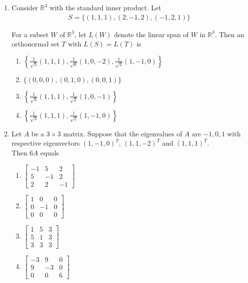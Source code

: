 \documentclass[journal]{IEEEtran}
\newcommand{\myvec}[1]{\begin{bmatrix}#1\end{bmatrix}}
\numberwithin{equation}{enumi}
\numberwithin{figure}{enumi}
\begin{document}
\begin{enumerate}
\item Consider $\mathbb{R}^3$ with the standard inner product. Let
\begin{align*}
 S = \{(1,1,1), (2,-1,2), (-1,2,1)\}   
\end{align*}

For a subset $W$ of $\mathbb{R}^3$, let $L(W)$ denote the linear span of $W$ in $\mathbb{R}^3$. Then an orthonormal set $T$ with $L(S) = L(T)$ is  \hfill{}
    \begin{multicols}{2}
    \begin{enumerate}
        \item $\left\{ \frac{1}{\sqrt{3}}(1,1,1), \frac{1}{\sqrt{6}}(1,0,-2), \frac{1}{\sqrt{2}}(1,-1,0) \right\}$ 
        \item $\{(0,0,0), (0,1,0), (0,0,1)\}$
        \item $\left\{ \frac{1}{\sqrt{3}}(1,1,1), \frac{1}{\sqrt{2}}(1,0,-1) \right\}$        \item $\left\{ \frac{1}{\sqrt{3}}(1,1,1), \frac{1}{\sqrt{2}}(1,-1,0) \right\}$
    \end{enumerate}
    \end{multicols}


\item Let $A$ be a $3 \times 3$ matrix. Suppose that the eigenvalues of $A$ are $-1, 0, 1$ with respective eigenvectors $(1, -1, 0)^T$, $(1, 1, -2)^T$ and $(1, 1, 1)^T$. \\Then $6A$ equals
\hfill{}

\begin{multicols}{2}
    \begin{enumerate}
        \item $\myvec{ -1 & 5 & 2 \\ 5 & -1 & 2 \\ 2 & 2 & -1 }$
        \item $\myvec{ 1 & 0 & 0 \\ 0 & -1 & 0 \\ 0 & 0 & 0 }$
        \item $\myvec{ 1 & 5 & 3 \\ 5 & 1 & 3 \\ 3 & 3 & 3 }$
        \item $\myvec{ -3 & 9 & 0 \\ 9 & -3 & 0 \\ 0 & 0 & 6}$ 
    \end{enumerate}
    \end{multicols}



\end{enumerate}
\end{document}
